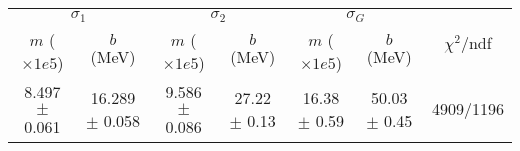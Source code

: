 \begin{tabular}{cc|cc|cc||c}
\multicolumn{2}{c|}{$\sigma_1$} & \multicolumn{2}{|c}{$\sigma_2$} & \multicolumn{2}{|c}{$\sigma_G$}  & \multirow{2}{*}{$\chi^2/$ndf}\\
$m$ ($\times1e5$) & $b$ (MeV) & $m$ ($\times1e5$) & $b$ (MeV) & $m$ ($\times1e5$) & $b$ (MeV) & \\
\hline
8.497 $\pm$ 0.061 & 16.289 $\pm$ 0.058 & 9.586 $\pm$ 0.086 & 27.22 $\pm$ 0.13 & 16.38 $\pm$ 0.59 & 50.03 $\pm$ 0.45 & 4909/1196\\
\end{tabular}

